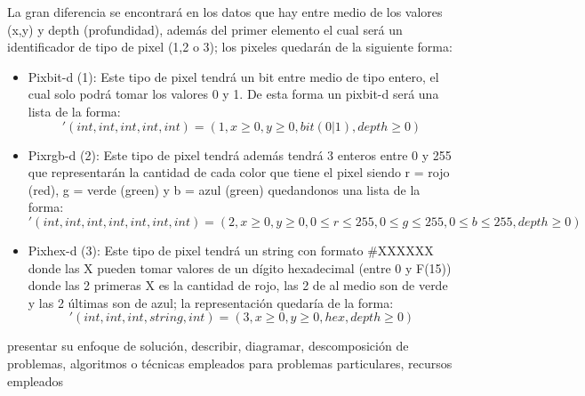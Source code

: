  La gran diferencia se encontrará en los datos que hay entre medio de los valores (x,y) y depth (profundidad), además del primer elemento
el cual será un identificador de tipo de pixel (1,2 o 3); los pixeles quedarán de la siguiente forma:
 \begin{itemize}
    \item Pixbit-d (1): Este tipo de pixel tendrá un bit entre medio de tipo entero, el cual solo podrá 
    tomar los valores 0 y 1. De esta forma un pixbit-d será una lista de la forma:
    \begin{equation*}
        '(int ,int, int, int, int) = (1, x \geq 0, y \geq 0, bit(0|1), depth \geq 0)
    \end{equation*}
     
    \item Pixrgb-d (2): Este tipo de pixel tendrá además tendrá 3 enteros entre 0 y 255 que representarán la 
    cantidad de cada color que tiene el pixel siendo r = rojo (red), g = verde (green) y b = azul (green)
    quedandonos una lista de la forma:
    \begin{equation*}
        '(int, int, int, int, int, int, int) = (2, x \geq 0, y \geq 0, 0 \leq r \leq 255, 0 \leq g \leq 255, 0 \leq b \leq 255, depth \geq 0)
    \end{equation*}
    
    \item Pixhex-d (3): Este tipo de pixel tendrá un string con formato \#XXXXXX donde las X pueden tomar valores de un dígito hexadecimal (entre 0 y F(15))
    donde las 2 primeras X es la cantidad de rojo, las 2 de al medio son de verde y las 2 últimas son de azul; la representación quedaría de la forma:
    \begin{equation*}
        '(int, int, int, string, int) = (3, x \geq 0, y \geq 0, hex, depth \geq 0)
    \end{equation*}
 \end{itemize}

 presentar su enfoque de solución, describir, diagramar, 
 descomposición de problemas, algoritmos o técnicas empleados para
  problemas particulares, recursos empleados